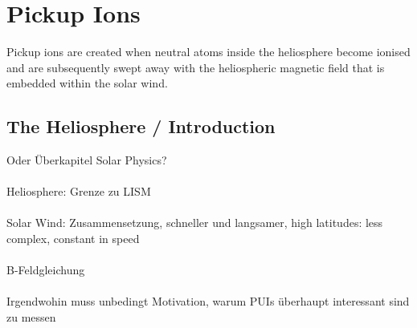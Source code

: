
\chapter{Pickup Ions} %

\label{Chapter1} %





Pickup ions are created when neutral atoms inside the heliosphere become ionised and are subsequently swept away with the heliospheric magnetic field that is embedded within the solar wind.


\section{The Heliosphere / Introduction}

Oder Überkapitel Solar Physics?
\\ \\
Heliosphere: Grenze zu LISM
\\ \\
Solar Wind: Zusammensetzung, schneller und langsamer, high latitudes: less complex, constant in speed \\ \\
B-Feldgleichung
\\ \\
Irgendwohin muss unbedingt Motivation, warum PUIs überhaupt interessant sind zu messen



